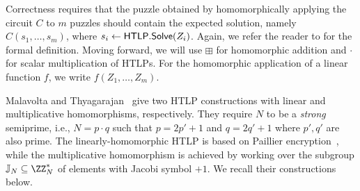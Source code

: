 Correctness requires that %
the puzzle obtained by homomorphically applying the circuit $C$ to $m$ puzzles should contain the expected solution, namely $C(s_1, \dots, s_m)$, where $s_i \gets \mathsf{HTLP}.{\sf Solve}(Z_i)$. Again, we refer the reader to \cite{C:MalThy19} for the formal definition. Moving forward, we will use $\boxplus$ for homomorphic addition and $\cdot$ for scalar multiplication of HTLPs. For the homomorphic application of a linear function $f$, we write $f(Z_1, \dots, Z_m)$.



Malavolta and Thyagarajan~\cite{C:MalThy19} give two HTLP constructions with linear and multiplicative homomorphisms, respectively. They require $N$ to be a \emph{strong} semiprime, i.e., $N = p \cdot q$ such that $p = 2p' + 1$ and $q = 2q' + 1$ where $p', q'$ are also prime. The linearly-homomorphic HTLP is based on Paillier encryption~\cite{EC:Paillier99}, while the multiplicative homomorphism is achieved by working over the subgroup $\JJ_N \subseteq \ZZ_N^*$ of elements with Jacobi symbol $+1$. 
We recall their constructions below.

